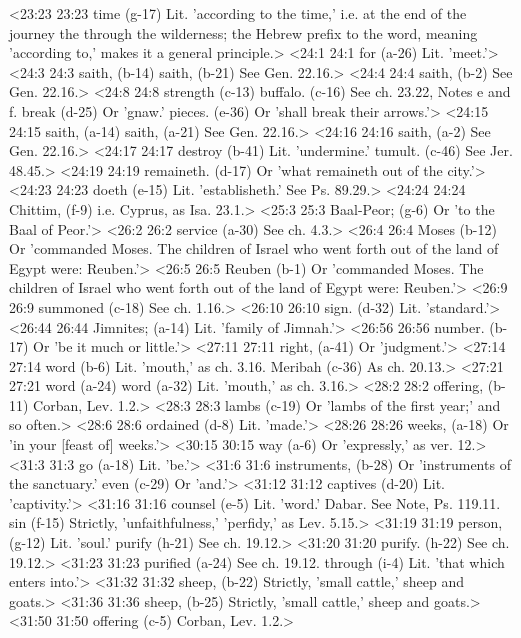 <23:23 23:23  time (g-17)  Lit. 'according to the time,' i.e. at the end of the journey  the through the wilderness; the Hebrew prefix to the word,  meaning 'according to,' makes it a general principle.>
<24:1 24:1  for (a-26)  Lit. 'meet.'>
<24:3 24:3  saith, (b-14)  saith, (b-21)
  See Gen. 22.16.>
<24:4 24:4  saith, (b-2)  See Gen. 22.16.>
<24:8 24:8  strength (c-13)  buffalo. (c-16)
  See ch. 23.22, Notes e and f.
  break (d-25)  Or 'gnaw.'
  pieces. (e-36)  Or 'shall break their arrows.'>
<24:15 24:15  saith, (a-14)  saith, (a-21)
  See Gen. 22.16.>
<24:16 24:16  saith, (a-2)  See Gen. 22.16.>
<24:17 24:17  destroy (b-41)  Lit. 'undermine.'
  tumult. (c-46)  See Jer. 48.45.>
<24:19 24:19  remaineth. (d-17)  Or 'what remaineth out of the city.'>
<24:23 24:23  doeth (e-15)  Lit. 'establisheth.' See Ps. 89.29.>
<24:24 24:24  Chittim, (f-9)  i.e. Cyprus, as Isa. 23.1.>
<25:3 25:3  Baal-Peor; (g-6)  Or 'to the Baal of Peor.'>
<26:2 26:2  service (a-30)  See ch. 4.3.>
<26:4 26:4  Moses (b-12) Or 'commanded Moses. The children of Israel who went forth out of the land of Egypt were: Reuben.'>
<26:5 26:5  Reuben (b-1)  Or 'commanded Moses. The children of Israel who went forth  out of the land of Egypt were: Reuben.'>
<26:9 26:9  summoned (c-18)  See ch. 1.16.>
<26:10 26:10  sign. (d-32)  Lit. 'standard.'>
<26:44 26:44  Jimnites; (a-14)  Lit. 'family of Jimnah.'>
<26:56 26:56  number. (b-17)  Or 'be it much or little.'>
<27:11 27:11  right, (a-41)  Or 'judgment.'>
<27:14 27:14  word (b-6)  Lit. 'mouth,' as ch. 3.16.
  Meribah (c-36)  As ch. 20.13.>
<27:21 27:21  word (a-24)  word (a-32)
  Lit. 'mouth,' as ch. 3.16.>
<28:2 28:2  offering, (b-11)  Corban, Lev. 1.2.>
<28:3 28:3  lambs (c-19)  Or 'lambs of the first year;' and so often.>
<28:6 28:6  ordained (d-8)  Lit. 'made.'>
<28:26 28:26  weeks, (a-18)  Or 'in your [feast of] weeks.'>
<30:15 30:15  way (a-6)  Or 'expressly,' as ver. 12.>
<31:3 31:3  go (a-18)  Lit. 'be.'>
<31:6 31:6  instruments, (b-28)  Or 'instruments of the sanctuary.'
  even (c-29)  Or 'and.'>
<31:12 31:12  captives (d-20)  Lit. 'captivity.'>
<31:16 31:16  counsel (e-5)  Lit. 'word.' Dabar. See Note, Ps. 119.11.
  sin (f-15)  Strictly, 'unfaithfulness,' 'perfidy,' as Lev. 5.15.>
<31:19 31:19  person, (g-12)  Lit. 'soul.'
  purify (h-21) See ch. 19.12.>
<31:20 31:20  purify. (h-22)  See ch. 19.12.>
<31:23 31:23  purified (a-24)  See ch. 19.12.
  through (i-4)  Lit. 'that which enters into.'>
<31:32 31:32  sheep, (b-22) Strictly, 'small cattle,' sheep and goats.>
<31:36 31:36  sheep, (b-25)  Strictly, 'small cattle,' sheep and goats.>
<31:50 31:50  offering (c-5)  Corban, Lev. 1.2.>

